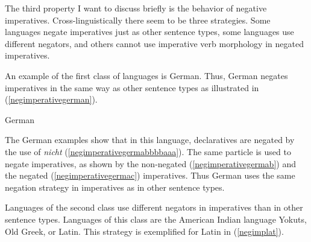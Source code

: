The third property I want to discuss briefly is the behavior of negative imperatives. Cross-linguistically there seem to be three strategies. Some languages negate imperatives just as other sentence types, some languages use different negators, and others cannot use imperative verb morphology in negated imperatives. 

\newpage
An example of the first class of languages is German. Thus, German negates imperatives in the same way as other sentence types as illustrated in (\ref{negimperativegerman}). 

\begin{exe}
\ex German\label{negimperativegerman}
\begin{xlist}
\end{xlist}
\end{exe}

\noindent The German examples show that in this language, declaratives are negated by the use of \textit{nicht} (\ref{negimperativegermabbbbaaa}). The same particle is used to negate imperatives, as shown by the non-negated (\ref{negimperativegermab}) and the negated (\ref{negimperativegermac}) imperatives. Thus German uses the same negation strategy in imperatives as in other sentence types.%

Languages of the second class use different negators in imperatives than in other sentence types. Languages of this class are the American Indian language Yokuts, Old Greek, or Latin. This strategy is exemplified for Latin in (\ref{negimplat}).

